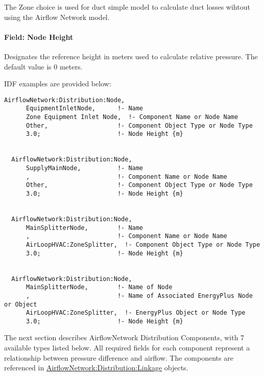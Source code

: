 The Zone choice is used for duct simple model to calculate duct losses wihtout using the Airflow Network model.

\paragraph{Field: Node Height}\label{field-node-height-1}

Designates the reference height in meters used to calculate relative pressure. The default value is 0 meters.

IDF examples are provided below:

\begin{lstlisting}
AirflowNetwork:Distribution:Node,
      EquipmentInletNode,      !- Name
      Zone Equipment Inlet Node,  !- Component Name or Node Name
      Other,                   !- Component Object Type or Node Type
      3.0;                     !- Node Height {m}


  AirflowNetwork:Distribution:Node,
      SupplyMainNode,          !- Name
      ,                        !- Component Name or Node Name
      Other,                   !- Component Object Type or Node Type
      3.0;                     !- Node Height {m}


  AirflowNetwork:Distribution:Node,
      MainSplitterNode,        !- Name
      ,                        !- Component Name or Node Name
      AirLoopHVAC:ZoneSplitter,  !- Component Object Type or Node Type
      3.0;                     !- Node Height {m}


  AirflowNetwork:Distribution:Node,
      MainSplitterNode,        !- Name of Node
      ,                        !- Name of Associated EnergyPlus Node or Object
      AirLoopHVAC:ZoneSplitter,  !- EnergyPlus Object or Node Type
      3.0;                     !- Node Height {m}
\end{lstlisting}

The next section describes AirflowNetwork Distribution Components, with 7 available types listed below. All required fields for each component represent a relationship between pressure difference and airflow. The components are referenced in \hyperref[airflownetworkdistributionlinkage]{AirflowNetwork:Distribution:Linkage} objects.

